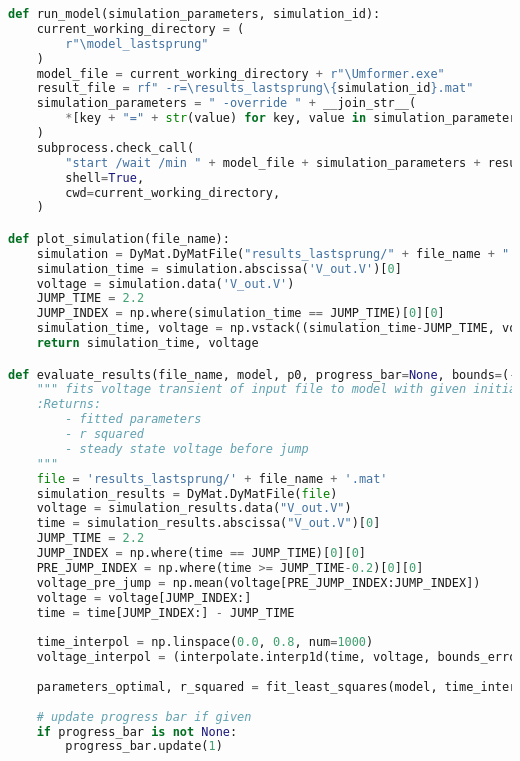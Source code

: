 \begin{lstlisting}[language=python, caption=Auszug aus \texttt{modelicaSweep.py}, label=lst:ModelicaSweep]
def run_model(simulation_parameters, simulation_id):
    current_working_directory = (
        r"\model_lastsprung"
    )
    model_file = current_working_directory + r"\Umformer.exe"
    result_file = rf" -r=\results_lastsprung\{simulation_id}.mat"
    simulation_parameters = " -override " + __join_str__(
        *[key + "=" + str(value) for key, value in simulation_parameters.items()], sep=""
    )
    subprocess.check_call(
        "start /wait /min " + model_file + simulation_parameters + result_file,
        shell=True,
        cwd=current_working_directory,
    )

def plot_simulation(file_name):
    simulation = DyMat.DyMatFile("results_lastsprung/" + file_name + ".mat")
    simulation_time = simulation.abscissa('V_out.V')[0]
    voltage = simulation.data('V_out.V')
    JUMP_TIME = 2.2
    JUMP_INDEX = np.where(simulation_time == JUMP_TIME)[0][0]
    simulation_time, voltage = np.vstack((simulation_time-JUMP_TIME, voltage))[:,JUMP_INDEX:] # Combine both arrays to slice them with only one command
    return simulation_time, voltage

def evaluate_results(file_name, model, p0, progress_bar=None, bounds=(-np.inf, np.inf)):
    """ fits voltage transient of input file to model with given initial guess p0
    :Returns:
        - fitted parameters
        - r squared
        - steady state voltage before jump
    """   
    file = 'results_lastsprung/' + file_name + '.mat'
    simulation_results = DyMat.DyMatFile(file)
    voltage = simulation_results.data("V_out.V")
    time = simulation_results.abscissa("V_out.V")[0]
    JUMP_TIME = 2.2
    JUMP_INDEX = np.where(time == JUMP_TIME)[0][0]
    PRE_JUMP_INDEX = np.where(time >= JUMP_TIME-0.2)[0][0]
    voltage_pre_jump = np.mean(voltage[PRE_JUMP_INDEX:JUMP_INDEX])
    voltage = voltage[JUMP_INDEX:]
    time = time[JUMP_INDEX:] - JUMP_TIME
    
    time_interpol = np.linspace(0.0, 0.8, num=1000)
    voltage_interpol = (interpolate.interp1d(time, voltage, bounds_error=False, fill_value=(voltage[0],voltage[-1])))(time_interpol)
    
    parameters_optimal, r_squared = fit_least_squares(model, time_interpol, voltage_interpol, list_of_p0s=p0, bounds=bounds)
    
    # update progress bar if given
    if progress_bar is not None:
        progress_bar.update(1)
        

\end{lstlisting}

